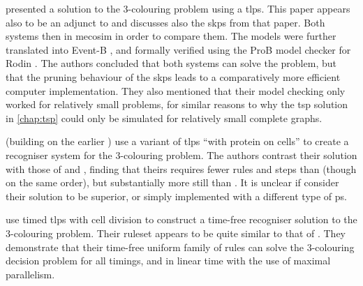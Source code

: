 
\citeauthor{Turcanu2012} \cite{Turcanu2012} presented a solution to the 3-colouring problem using a \gls{tlps}. This paper appears also to be an adjunct to \cite{Gheorghe2013} and discusses also the \gls{skps} from that paper.  Both systems then in \gls{mecosim} in order to compare them.  The models were further translated into Event-B \cite{Abrial2010}, and formally verified using the ProB model checker \cite{Leuschel2008} for Rodin \cite{Abrial2010a}.  The authors concluded that both systems can solve the problem, but that the pruning behaviour of the \gls{skps} leads to a comparatively more efficient computer implementation.  They also mentioned that their model checking only worked for relatively small problems, for similar reasons to why the \gls{tsp} solution in \cref{chap:tsp} could only be simulated for relatively small complete graphs.


\citeauthor{Christinal2018} \cite{Christinal2018} (building on the earlier \cite{Mathu2015}) use a variant of \gls{tlps} \enquote{with protein on cells} to create a recogniser system for the 3-colouring problem.  The authors contrast their solution with those of \cite{Diaz-Pernil2008} and \cite{Gheorghe2013}, finding that theirs requires fewer rules and steps than \cite{Diaz-Pernil2008} (though on the same order), but substantially more still than \cite{Gheorghe2013}.  It is unclear if \citeauthor{Christinal2018} consider their solution to be superior, or simply implemented with a different type of \gls{ps}.


\citeauthor{Niu2016} \cite{Niu2016} use timed \gls{tlps} with cell division to construct a time-free recogniser solution to the 3-colouring problem. Their \gls{ruleset} appears to be quite similar to that of \cite{Turcanu2012}.  They demonstrate that their time-free uniform family of rules can solve the 3-colouring decision problem for all timings, and in linear time with the use of maximal parallelism.



